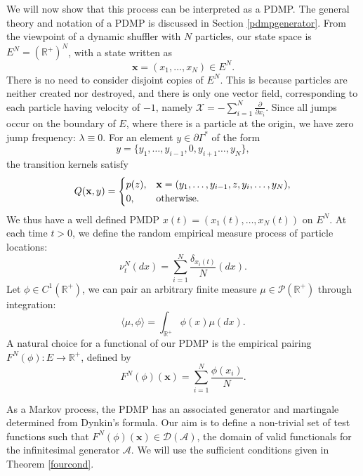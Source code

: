 We will now show that this process can be interpreted as a PDMP.  The general theory and notation of a PDMP is discussed in  Section \ref{pdmpgenerator}.  From the viewpoint of a dynamic shuffler with $N$ particles, our state space is $E^N = \mathbb{(R^+)}^N$, with a state written as
\begin{equation}
\mathbf x = (x_1, \dots, x_N) \in E^N.
\end{equation}
 There is no need to consider disjoint copies of $E^N$. This is because particles are neither created nor destroyed, and there is only one vector field, corresponding to each particle having velocity of $-1$, namely $\mathcal X= -\sum_{i = 1}^N\frac{\partial}{\partial x_i}$.  Since all jumps  occur on the boundary of $E$, where there is a particle at the origin, we have zero jump frequency: $\lambda \equiv 0$. For an element $y \in \partial \Gamma^*$ of the form
\begin{equation}
y= \{y_1, \dots, y_{i-1},0, y_{i+1} \dots, y_N\},
\end{equation} 
the transition kernels satisfy
\begin{equation}
Q(\mathbf x,y) = \begin{cases}p(z), & \mathbf x= (y_1,\dots, y_{i-1},z,y_i,\dots, y_N), \\
0, & \hbox{otherwise.} \\
\end{cases}
\end{equation}
 We thus have a well defined PMDP  $x(t) = (x_1(t), \dots, x_N(t))$ on $E^N$. 
At each time $t >0$, we define the random empirical measure process of particle locations: 
\begin{equation}
\nu^N_t (dx) = \sum_{i = 1}^N \frac{\delta_{x_i(t)}}{N}(dx).  \nonumber
\end{equation}
Let $\phi \in C^1(\mathbb{R}^+)$, we can pair an arbitrary finite measure $\mu \in \mathcal P(\mathbb R^+) $ through integration:  
\begin{equation}
\langle \mu, \phi \rangle = \int_{\mathbb{R}^+}\phi(x) \mu(dx). \nonumber
\end{equation} A natural choice for  a functional of our PDMP is the empirical pairing $F^N(\phi):E \rightarrow \mathbb{R}^+$, defined by 
\begin{equation}
F^N(\phi)(\mathbf x) = \sum_{i = 1}^N \frac{\phi(x_i)}{N} .  \end{equation}

As a Markov process, the PDMP has an associated generator and martingale determined from Dynkin's formula. Our aim is to define a non-trivial set of test functions such that $F^N(\phi)(\mathbf x)\in \mathcal D(\mathcal A)$,    the domain of valid functionals for the infinitesimal generator $\mathcal A$.  We will use the sufficient conditions given in Theorem \ref{fourcond}.  

